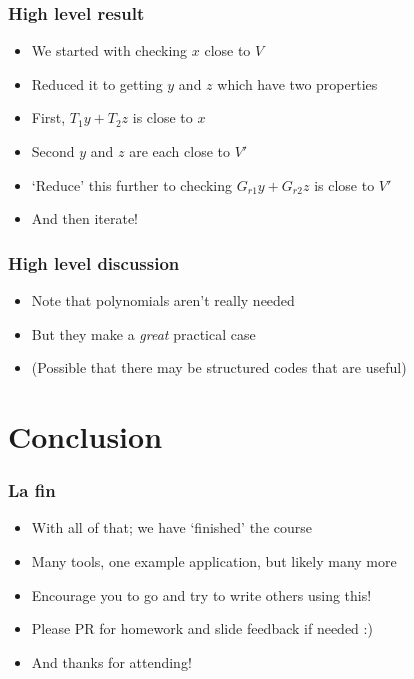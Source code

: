 \documentclass{beamer}
\begin{document}
    \begin{frame}
        \frametitle{High level result}
        \begin{itemize}\itemsep=12pt
            \item We started with checking $x$ close to $V$
            \item Reduced it to getting $y$ and $z$ which have two properties
            \pause
            \item First, $T_1y + T_2z$ is close to $x$
            \pause
            \item Second $y$ and $z$ are each close to $V'$
            \item `Reduce' this further to checking $G_{r1}y + G_{r2}z$ is close to $V'$
            \pause
            \item And then iterate!
        \end{itemize}
	\end{frame}

    \begin{frame}
        \frametitle{High level discussion}
        \begin{itemize}\itemsep=12pt
            \item Note that polynomials aren't really needed
            \item But they make a \emph{great} practical case
            \item (Possible that there may be structured codes that are useful)
        \end{itemize}
	\end{frame}

    \section{Conclusion}
    \begin{frame}
        \frametitle{La fin}
        \begin{itemize}\itemsep=12pt
            \item With all of that; we have `finished' the course
            \item Many tools, one example application, but likely many more
            \item Encourage you to go and try to write others using this!
            \item Please PR for homework and slide feedback if needed :)
            \pause
            \item And thanks for attending!
        \end{itemize}
	\end{frame}
\end{document}
